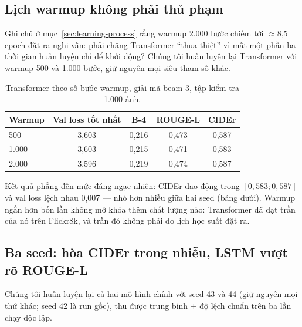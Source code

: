 \subsection{Lịch warmup không phải thủ phạm}

Ghi chú ở mục~\ref{sec:learning-process} rằng warmup 2.000 bước chiếm tới
$\approx$8,5 epoch đặt ra nghi vấn: phải chăng Transformer ``thua thiệt'' vì
mất một phần ba thời gian huấn luyện chỉ để khởi động? Chúng tôi huấn luyện lại
Transformer với warmup 500 và 1.000 bước, giữ nguyên mọi siêu tham số khác.

\begin{table}[H]
	\centering
	\caption{Transformer theo số bước warmup, giải mã beam 3, tập kiểm tra
	1.000 ảnh.}
	\label{tab:warmup-sweep}
	\begin{tabular}{lcccc}
		\hline
		\textbf{Warmup} & \textbf{Val loss tốt nhất} & \textbf{B-4} & \textbf{ROUGE-L} & \textbf{CIDEr} \\
		\hline
		500   & 3,603 & 0,216 & 0,473 & 0,587 \\
		1.000 & 3,603 & 0,215 & 0,471 & 0,583 \\
		2.000 & 3,596 & 0,219 & 0,474 & 0,587 \\
		\hline
	\end{tabular}
\end{table}

Kết quả phẳng đến mức đáng ngạc nhiên: CIDEr dao động trong $[0{,}583;
0{,}587]$ và val loss lệch nhau 0,007 --- nhỏ hơn nhiễu giữa hai seed (bảng
dưới). Warmup ngắn hơn bốn lần không mở khóa thêm chất lượng nào: Transformer
đã đạt trần của nó trên Flickr8k, và trần đó không phải do lịch học suất đặt ra.

\subsection{Ba seed: hòa CIDEr trong nhiễu, LSTM vượt rõ ROUGE-L}

Chúng tôi huấn luyện lại cả hai mô hình chính với seed 43 và 44 (giữ nguyên
mọi thứ khác; seed 42 là run gốc), thu được trung bình $\pm$ độ lệch chuẩn trên
ba lần chạy độc lập.


